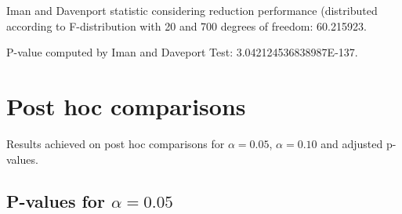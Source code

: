\documentclass[a4paper,10pt]{article}
\begin{document}
\begin{landscape}
Iman and Davenport statistic considering reduction performance (distributed according to F-distribution with 20 and 700 degrees of freedom: 60.215923.

P-value computed by Iman and Daveport Test: 3.042124536838987E-137.\newline



\pagebreak

\section{Post hoc comparisons}

Results achieved on post hoc comparisons for $\alpha = 0.05$, $\alpha = 0.10$ and adjusted p-values.

\subsection{P-values for $\alpha=0.05$}


\end{landscape}
\end{document}
